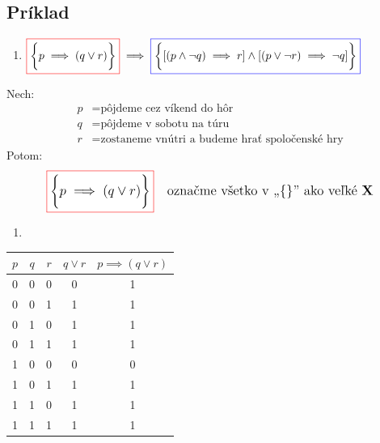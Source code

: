 \documentclass{article}
\begin{document}
\subsection{Príklad}
\vspace{5mm}
\begin{enumerate}[label=\alph*)]
    \item {\large $\displaystyle \fcolorbox{red}{white}{$\displaystyle \bigg\{p \implies (q \lor r)\bigg\}$} \implies \fcolorbox{blue}{white}{$\displaystyle \bigg\{[(p \land \neg q) \implies r] \land [(p \lor \neg r) \implies \neg q]\bigg\}$}$}
\end{enumerate}
\vspace{15mm}
Nech:
\begin{align*}
p &= \text{pôjdeme cez víkend do hôr} \\
q &= \text{pôjdeme v sobotu na túru} \\
r &= \text{zostaneme vnútri a budeme hrať spoločenské hry}
\end{align*}
\vspace{5mm}
Potom:
\begin{align*}
\large \fcolorbox{red}{white}{$\displaystyle \bigg\{p \implies (q \lor r)\bigg\}$} \quad \text{označme všetko v ,,\{\}'' ako veľké \textbf{X}}
\end{align*}
\vspace{5mm}
\begin{enumerate}[label=\alph*)]
    \item {}
\end{enumerate}
\vspace{5mm}
\begin{center}
\large %
\renewcommand{\arraystretch}{1.1} %
\setlength{\tabcolsep}{8pt} %
\begin{tabular}{|c|c|c|c|c|}
\hline
$p$ & $q$ & $r$ & $q \lor r$ & $p \implies (q \lor r)$ \\ \hline
0 & 0 & 0 & 0 & 1 \\ \hline
0 & 0 & 1 & 1 & 1 \\ \hline
0 & 1 & 0 & 1 & 1 \\ \hline
0 & 1 & 1 & 1 & 1 \\ \hline
1 & 0 & 0 & 0 & 0 \\ \hline
1 & 0 & 1 & 1 & 1 \\ \hline
1 & 1 & 0 & 1 & 1 \\ \hline
1 & 1 & 1 & 1 & 1 \\ \hline
\end{tabular}
\end{center}
\end{document}
